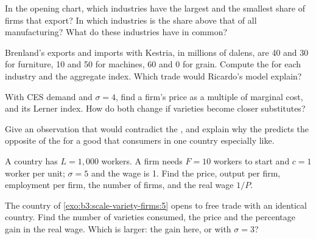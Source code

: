\begin{exercise}[$\star$]\label{exo:b3:scale-variety-firms:1}
In the opening chart, which industries have the largest and the smallest share
of firms that export? In which industries is the share above that of all
manufacturing? What do these industries have in common?
\end{exercise}

\begin{exercise}[$\star$]\label{exo:b3:scale-variety-firms:2}
Brenland's exports and imports with Kestria, in millions of dalens, are 40 and
30 for furniture, 10 and 50 for machines, 60 and 0 for grain. Compute the
 for each industry and the aggregate index. Which trade would
Ricardo's model explain?
\end{exercise}

\begin{exercise}[$\star$]\label{exo:b3:scale-variety-firms:3}
With CES demand and $\sigma = 4$, find a firm's price as a multiple of marginal
cost, and its Lerner index. How do both change if varieties become closer
substitutes?
\end{exercise}

\begin{exercise}[$\star$]\label{exo:b3:scale-variety-firms:4}
Give an observation that would contradict the , and explain
why the  predicts the opposite of the 
for a good that consumers in one country especially like.
\end{exercise}

\begin{exercise}[$\star\star$]\label{exo:b3:scale-variety-firms:5}
A country has $L = 1{,}000$ workers. A firm needs $F = 10$ workers to start and $c =
1$ worker per unit; $\sigma = 5$ and the wage is 1. Find the price, output per firm,
employment per firm, the number of firms, and the real wage $1/P$.
\end{exercise}

\begin{exercise}[$\star\star$]\label{exo:b3:scale-variety-firms:6}
The country of \cref{exo:b3:scale-variety-firms:5} opens to free trade with an
identical country. Find the number of varieties consumed, the price and the
percentage gain in the real wage. Which is larger: the gain here, or with
$\sigma = 3$?
\end{exercise}

